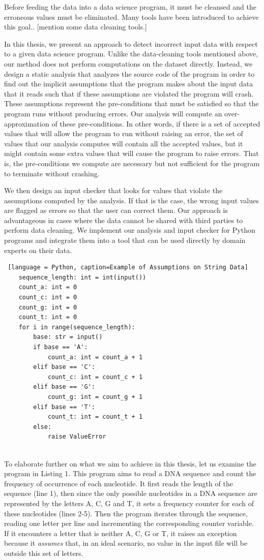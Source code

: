 \documentclass[10pt]{report}
\begin{document}
Before feeding the data into a data science program, it must be cleansed and the erroneous values must be eliminated. Many tools have been introduced to achieve this goal.. [mention some data cleaning tools.] 

In this thesis, we present an approach to detect incorrect input data with respect to a given data science program. Unlike the data-cleaning tools mentioned above, our method does not perform computations on the dataset directly. Instead, we design a static analysis that analyzes the source code of the program in order to find out the implicit assumptions that the program makes about the input data that it reads such that if these assumptions are violated the program will crash. These assumptions represent the pre-conditions that must be satisfied so that the program runs without producing errors. Our analysis will compute an over-approximation of these pre-conditions. In other words, if there is a set of accepted values that will allow the program to run without raising an error, the set of values that our analysis computes will contain all the accepted values, but it might contain some extra values that will cause the program to raise errors. That is, the pre-conditions we compute are necessary but not sufficient for the program to terminate without crashing. 

We then design an input checker that looks for values that violate the assumptions computed by the analysis. If that is the case, the wrong input values are flagged as errors so that the user can correct them. Our approach is advantageous in cases where the data cannot be shared with third parties to perform data cleaning. We implement our analysis and input checker for Python programs and integrate them into a tool that can be used directly by domain experts on their data. 
\begin{lstlisting} [language = Python, caption=Example of Assumptions on String Data] 
	sequence_length: int = int(input())
	count_a: int = 0
	count_c: int = 0
	count_g: int = 0
	count_t: int = 0
	for i in range(sequence_length):
		base: str = input()
		if base == 'A':
			count_a: int = count_a + 1
		elif base == 'C':
			count_c: int = count_c + 1
		elif base == 'G':
			count_g: int = count_g + 1
		elif base == 'T':
			count_t: int = count_t + 1
		else:
			raise ValueError
			
\end{lstlisting} 

To elaborate further on what we aim to achieve in this thesis, let us examine the program in Listing 1. This program aims to read a DNA sequence and count the frequency of occurrence of each nucleotide. It first reads the length of the sequence (line 1), then since the only possible nucleotides in a DNA sequence are represented by the letters A, C, G and T, it sets a frequency counter for each of these nucleotides (lines 2-5). Then the program iterates through the sequence, reading one letter per line and incrementing the corresponding counter variable. If it encounters a letter that is neither A, C, G or T, it raises an exception because it \textit{assumes} that, in an ideal scenario, no value in the input file will be outside this set of letters.  
\end{document}
